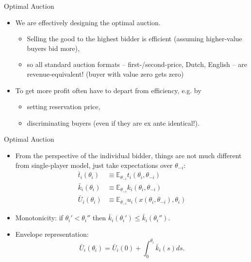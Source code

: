 \documentclass[english,10pt
,aspectratio=169
]{beamer}
\begin{document}
\begin{frame}{Optimal Auction}
\begin{itemize}
	\item We are effectively designing the optimal auction.
	\begin{itemize}
		\item Selling the good to the highest bidder is efficient (assuming higher-value buyers bid more),
		\item so all standard auction formats -- first-/second-price, Dutch, English -- are revenue-equivalent! (buyer with value zero gets zero)
	\end{itemize}
	\item To get more profit often have to depart from efficiency, e.g. by
	\begin{itemize}
		\item setting reservation price,
		\item discriminating buyers (even if they are ex ante identical!).
	\end{itemize}
\end{itemize}
\end{frame}


\begin{frame}{Optimal Auction}
\begin{itemize}
	\item From the perspective of the individual bidder, things are not much different from single-player model, just take expectations over $\theta_{-i}$:
	\begin{align*}
		\bar{t}_i(\theta_i) &\equiv \mathbb{E}_{\theta_{-i}} t_i(\theta_i,\theta_{-i})
		\\
		\bar{k}_i(\theta_i) &\equiv \mathbb{E}_{\theta_{-i}} k_i(\theta_i,\theta_{-i})
		\\
		\bar{U}_i(\theta_i) &\equiv \mathbb{E}_{\theta_{-i}} u_i(x(\theta_i,\theta_{-i}),\theta_i)
	\end{align*}
	\item Monotonicity: if $\theta_i' < \theta_i''$ then 
	$\bar{k}_i(\theta_i') \leq \bar{k}_i(\theta_i'').$
	\item Envelope representation: 
	$$\bar{U}_i(\theta_i) = \bar{U}_i(0) + \int_0^{\theta_i} \bar{k}_i(s) ds.$$
\end{itemize}
\end{frame}
\end{document}
